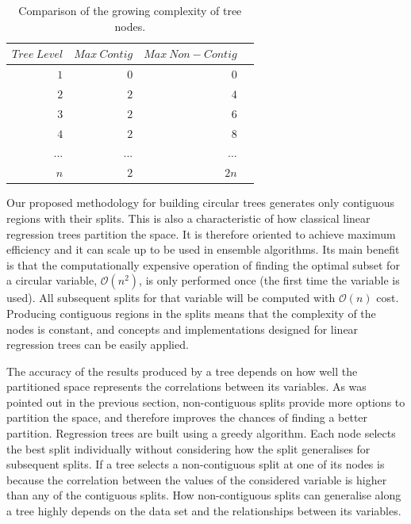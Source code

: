 \documentclass[times,twocolumn,final,authoryear]{elsarticle}
\begin{document}
\begin{table}[t]
\caption{Comparison of the growing complexity of tree nodes.}\label{t1}
\begin{center}
\begin{tabular}{rrrr}
\hline\hline
$Tree\ Level$ & $Max\ Contig$ & $Max\ Non-Contig$\\
\hline
$1$ & $0$ & $0$\\
$2$ & $2$ & $4$\\
$3$ & $2$ & $6$\\
$4$ & $2$ & $8$\\
... & ... & ...\\
$n$ & $2$ & $2n$\\

\hline
\end{tabular}
\end{center}
\end{table}

Our proposed methodology for building circular trees generates only contiguous regions with their splits. This is also a characteristic of how classical linear regression trees partition the space. It is therefore oriented to achieve maximum efficiency and it can scale up to be used in ensemble algorithms. Its main benefit is that the computationally expensive operation of finding the optimal subset for a circular variable, $\mathcal{O}(n^2)$, is only performed once (the first time the variable is used). All subsequent splits for that variable will be computed with $\mathcal{O}(n)$ cost. Producing contiguous regions in the splits means that the complexity of the nodes is constant, and concepts and implementations designed for linear regression trees can be easily applied.

The accuracy of the results produced by a tree depends on how well the partitioned space represents the correlations between its variables. As was pointed out in the previous section, non-contiguous splits provide more options to partition the space, and therefore improves the chances of finding a better partition. Regression trees are built using a greedy algorithm. Each node selects the best split individually without considering how the split generalises for subsequent splits. If a tree selects a non-contiguous split at one of its nodes is because the correlation between the values of the considered variable is higher than any of the contiguous splits. How non-contiguous splits can generalise along a tree highly depends on the data set and the relationships between its variables.
\end{document}
